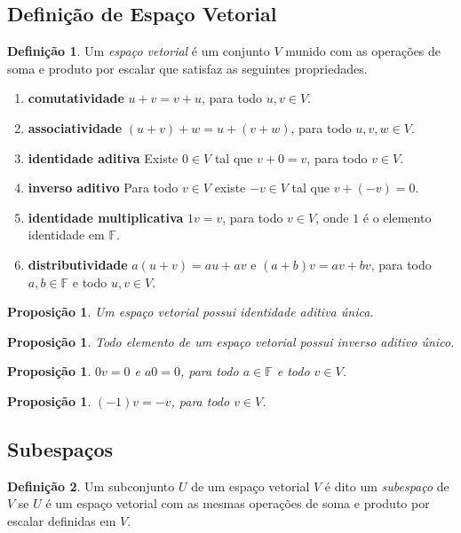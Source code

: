 \documentclass[12pt]{article}
\theoremstyle{plain}
\newtheorem{prop}[thm]{Proposição}
\theoremstyle{definition}
\newtheorem{defn}{Definição}[section]
\theoremstyle{remark}
\begin{document}
\subsection{Definição de Espaço Vetorial}
\begin{defn}
    Um \emph{espaço vetorial} é um conjunto \(V\) munido com as operações de soma e produto por escalar que satisfaz as seguintes propriedades.
    \begin{enumerate}
        \item[(A1)] \textbf{comutatividade} \(u + v = v + u\), para todo \(u, v \in V\).
        \item[(A2)] \textbf{associatividade} \((u + v) + w = u + (v + w)\), para todo \(u, v, w \in V\).
        \item[(A3)] \textbf{identidade aditiva} Existe \(0 \in V\) tal que \(v + 0 = v\), para todo \(v \in V\).
        \item[(A4)] \textbf{inverso aditivo} Para todo \(v \in V\) existe \(-v \in V\) tal que \(v + (-v) = 0\).
        \item[(A5)] \textbf{identidade multiplicativa} \(1v = v\), para todo \(v \in V\), onde \(1\) é o elemento identidade em \(\mathbb{F}\).
        \item[(A6)] \textbf{distributividade} \(a(u + v) = au + av\) e \((a+b)v=av + bv\), para todo \(a, b \in \mathbb{F}\) e todo \(u, v \in V\).
    \end{enumerate}
\end{defn}

\begin{prop}
    Um espaço vetorial possui identidade aditiva única.
\end{prop}

\begin{prop}
    Todo elemento de um espaço vetorial possui inverso aditivo único.
\end{prop}

\begin{prop}
    \(0v = 0\) e \(a0 = 0\), para todo \(a \in \mathbb{F}\) e todo \(v \in V\).
\end{prop}

\begin{prop}
    \((-1)v = -v\), para todo \(v \in V\).
\end{prop}

\subsection{Subespaços}
\begin{defn}
    Um subconjunto \(U\) de um espaço vetorial \(V\) é dito um \emph{subespaço} de \(V\) se \(U\) é um espaço vetorial com as mesmas operações de soma e produto por escalar definidas em \(V\).
\end{defn}
\end{document}
